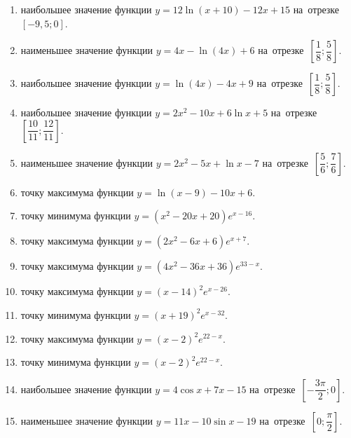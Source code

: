 \documentclass[a4paper,10pt]{article}
\begin{document}
\begin{enumerate}
\item {} наибольшее значение функции $y = 12\ln \left(x+10\right)-12x +15$ на~отрезке~$\left[-9,5;0\right]$.

\item {} наименьшее значение функции $y=4x-\ln \left(4x\right)+6$ на~отрезке~$\left[\dfrac{1}{8};\dfrac{5}{8}\right]$.

\item {} наибольшее значение функции $y=\ln \left(4x\right)-4x+9$ на~отрезке~$\left[\dfrac{1}{8};\dfrac{5}{8}\right]$.

\item {} наибольшее значение функции $y=2x^2-10x+6\ln x+5$ на~отрезке~$\left[\dfrac{10}{11};\dfrac{12}{11}\right]$.

\item {} наименьшее значение функции $y=2x^2-5x+\ln x-7$ на~отрезке~$\left[\dfrac{5}{6};\dfrac{7}{6}\right]$.

\item {} точку максимума функции $y=\ln \left(x-9\right)-10x+6$.

\item {} точку минимума функции $y=\left(x^2-20x+20\right)e^{x-16}$.

\item {} точку максимума функции $y=\left(2x^2-6x+6\right)e^{x+7}$.

\item {} точку максимума функции $y=\left(4x^2-36x+36\right)e^{33-x}$.

\item {} точку максимума функции $y=\left(x -14\right)^2e^{x-26}$.

\item {} точку минимума функции $y=\left(x +19\right)^2e^{x-32}$.

\item {} точку максимума функции $y=\left(x -2\right)^2e^{22-x}$.

\item {} точку минимума функции $y=\left(x -2\right)^2e^{22-x}$.

\item {} наибольшее значение функции $y=4\cos x+7x -15$ на~отрезке~$\left[-\dfrac{3\pi }{2};0\right]$.

\item {} наименьшее значение функции $y=11x-10\sin x -19$ на~отрезке~$\left[0;\dfrac{\pi }{2}\right]$.


\end{enumerate}
\end{document}
